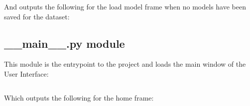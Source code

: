 \documentclass[./project-report/src/latex/project-report.tex]{subfiles}
\begin{document}
\begin{itemize}
        And outputs the following for the load model frame when no models have been saved for the dataset:

        \begin{figure}[h!]
        \centering
        \end{figure}
\end{itemize}

\subsection{\_\_main\_\_.py module}

This module is the entrypoint to the project and loads the main window of the User Interface:

\inputminted{python}{./school_project/__main__.py}

Which outputs the following for the home frame:

\begin{figure}[h!]
\centering
{}
\end{figure}
\end{document}
